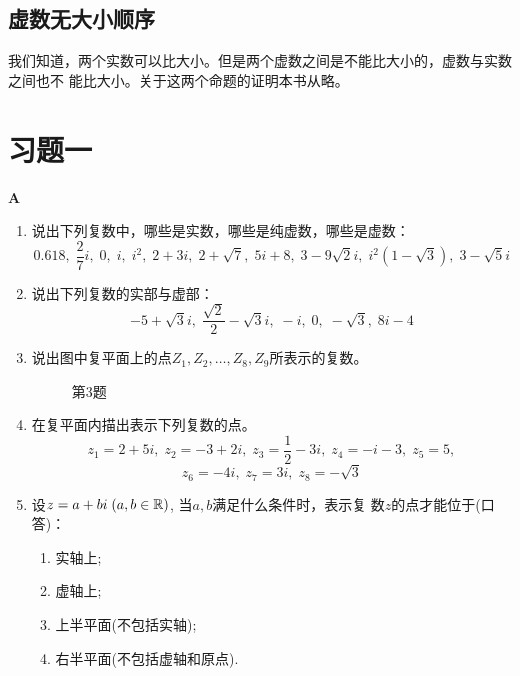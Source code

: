 \subsection{虚数无大小顺序}
我们知道，两个实数可以比大小。但是两个虚数之间是不能比大小的，虚数与实数之间也不
能比大小。关于这两个命题的证明本书从略。

\section*{习题一}
\begin{center}
    \bfseries A
\end{center}

\begin{enumerate}
    \item 说出下列复数中，哪些是实数，哪些是纯虚数，哪些是虚数：
    \[ 0.618,\; \frac{2}{7}i,\; 0,\; i,\; i^2,\; 2+3i,\; 2+\sqrt{7},\; 
    5i+8,\; 3-9\sqrt{2}i,\; i^2(1-\sqrt{3}),\; 3-\sqrt{5}i\]
    \item 说出下列复数的实部与虚部：
    \[-5+\sqrt{3}i,\; \frac{\sqrt{2}}{2}-\sqrt{3}i,\; -i,\; 0,\; -\sqrt{3},\; 8i-4\]
    \item 说出图中复平面上的点$Z_1,Z_2,\ldots,Z_8,Z_9$所表示的复数。
\begin{figure}[htp]
    \centering
{}
    \caption*{第3题}
\end{figure}

\item 在复平面内描出表示下列复数的点。
\[z_{1}=2+5i,\; z_{2}=-3+2i,\; z_{3}=\frac{1}{2}-3i,\; z_{4}=-i-3,\; z_{5}=5,\]
\[z_{6}=-4i,\; z_{7}=3i,\; z_{8}=-\sqrt{3}\]
\item 设$z=a+bi\; (a,b\in \mathbb{R})$, 当$a,b$满足什么条件时，表示复
数$z$的点才能位于(口答)：
\begin{multicols}{2}
\begin{enumerate}[(1)]
\item 实轴上;
\item 虚轴上;
\item 上半平面(不包括实轴);
\item 右半平面(不包括虚轴和原点).
\end{enumerate}
\end{multicols}


\end{enumerate}

